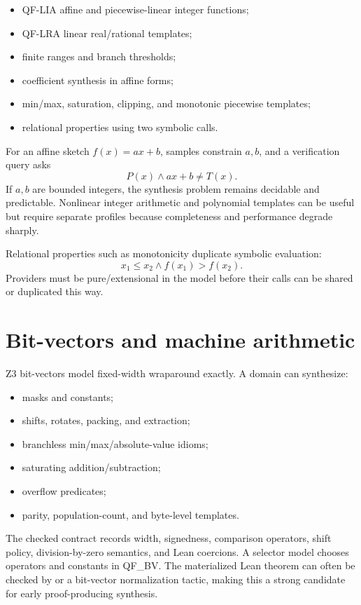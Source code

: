 \documentclass[10pt,letterpaper,oneside]{report}
\newcommand{\code}[1]{\texttt{\detokenize{#1}}}
\newcommand{\QFBV}{\textsf{QF\_BV}}
\begin{document}
\begin{itemize}
\item QF-LIA affine and piecewise-linear integer functions;
\item QF-LRA linear real/rational templates;
\item finite ranges and branch thresholds;
\item coefficient synthesis in affine forms;
\item min/max, saturation, clipping, and monotonic piecewise templates;
\item relational properties using two symbolic calls.
\end{itemize}

For an affine sketch $f(x)=ax+b$, samples constrain $a,b$, and a verification query asks
\[
  P(x)\land ax+b\ne T(x).
\]
If $a,b$ are bounded integers, the synthesis problem remains decidable and predictable. Nonlinear integer arithmetic and polynomial templates can be useful but require separate profiles because completeness and performance degrade sharply.

Relational properties such as monotonicity duplicate symbolic evaluation:
\[
  x_1\le x_2\land f(x_1)>f(x_2).
\]
Providers must be pure/extensional in the model before their calls can be shared or duplicated this way.

\section{Bit-vectors and machine arithmetic}

Z3 bit-vectors model fixed-width wraparound exactly. A domain can synthesize:

\begin{itemize}
\item masks and constants;
\item shifts, rotates, packing, and extraction;
\item branchless min/max/absolute-value idioms;
\item saturating addition/subtraction;
\item overflow predicates;
\item parity, population-count, and byte-level templates.
\end{itemize}

The checked contract records width, signedness, comparison operators, shift policy, division-by-zero semantics, and Lean coercions. A selector model chooses operators and constants in \QFBV. The materialized Lean theorem can often be checked by \code{bv_decide} or a bit-vector normalization tactic, making this a strong candidate for early proof-producing synthesis.
\end{document}
